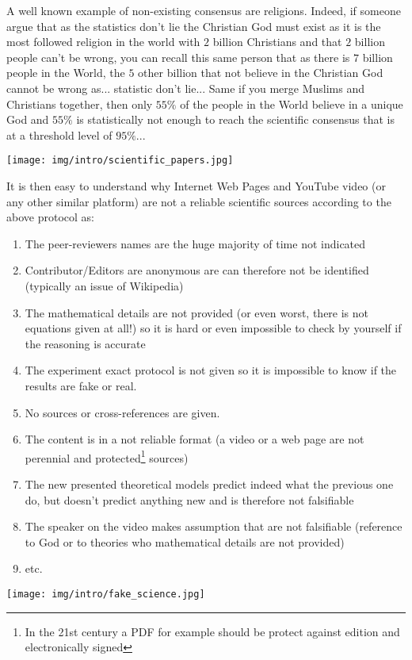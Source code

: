 	A well known example of non-existing consensus are religions. Indeed, if someone argue that as the statistics don't lie the Christian God must exist as it is the most followed religion in the world with $2$ billion Christians and that $2$ billion people can't be wrong, you can recall this same person that as there is $7$ billion people in the World, the $5$ other billion that not believe in the Christian God cannot be wrong as... statistic don't lie... Same if you merge Muslims and Christians together, then only $55\%$ of the people in the World believe in a unique God and $55\%$ is statistically not enough to reach the scientific consensus that is at a threshold level of $95\%$...
	\begin{center}
		\texttt{[image: img/intro/scientific\_papers.jpg]}
	\end{center}
	It is then easy to understand why Internet Web Pages and YouTube video (or any other similar platform) are not a reliable scientific sources according to the above protocol as:
	\begin{enumerate}
	   \item The peer-reviewers names are the huge majority of time not indicated
	   \item Contributor/Editors are anonymous are can therefore not be identified (typically an issue of Wikipedia)
	   \item The mathematical details are not provided (or even worst, there is not equations given at all!) so it is hard or even impossible to check by yourself if the reasoning is accurate
	   \item The experiment exact protocol is not given so it is impossible to know if the results are fake or real.
	   \item No sources or cross-references are given.
	   \item The content is in a not reliable format (a video or a web page are not perennial and protected\footnote{In the 21st century a PDF for example should be protect against edition and electronically signed} sources)
	   \item The new presented theoretical models predict indeed what the previous one do, but doesn't predict anything new and is therefore not falsifiable
	   \item The speaker on the video makes assumption that are not falsifiable (reference to God or to theories who mathematical details are not provided)
	   \item etc.
	\end{enumerate}
	\begin{center}
		\texttt{[image: img/intro/fake\_science.jpg]}
	\end{center}

